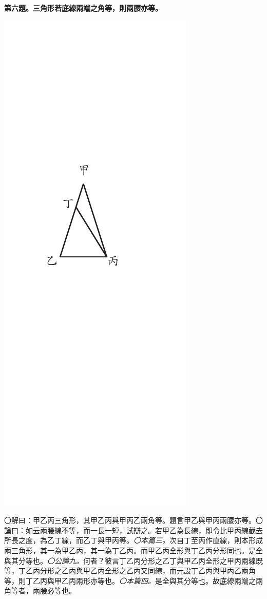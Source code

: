 \documentclass[12pt,b5paper,landscape]{article}
\newcommand{\ccom}[1]{{\footnotesize \emph{〇#1}}}
\newcommand{\bcom}[1]{〇#1}
\newcommand{\cthm}[1]{{
\vspace{8pt}

\bfseries #1}}
\begin{document}
\begin{multicols}{2}
\cthm{第六題。三角形若底線兩端之角等，則兩腰亦等。}
\begin{center}
\includegraphics[angle=90]{eu41}
\end{center}
\bcom{解曰：甲乙丙三角形，其甲乙丙與甲丙乙兩角等。題言甲乙與甲丙兩腰亦等。}\bcom{論曰：如云兩腰線不等，而一長一短，試辯之。若甲乙為長線，即令比甲丙線截去所長之度，為乙丁線，而乙丁與甲丙等。\ccom{本篇三。}次自丁至丙作直線，則本形成兩三角形，其一為甲乙丙，其一為丁乙丙。而甲乙丙全形與丁乙丙分形同也。是全與其分等也。\ccom{公論九。}何者？彼言丁乙丙分形之乙丁與甲乙丙全形之甲丙兩線既等，丁乙丙分形之乙丙與甲乙丙全形之乙丙又同線，而元設丁乙丙與甲丙乙兩角等，則丁乙丙與甲乙丙兩形亦等也。\ccom{本篇四。}是全與其分等也。故底線兩端之兩角等者，兩腰必等也。}


\end{multicols}
\end{document}
